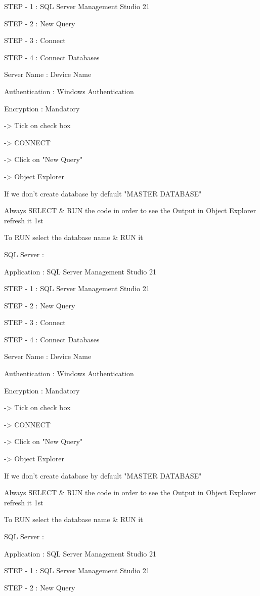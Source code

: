 STEP - 1 : SQL Server Management Studio 21

STEP - 2 : New Query

STEP - 3 : Connect

STEP - 4 : Connect Databases


Server Name : Device Name

Authentication : Windows Authentication

Encryption : Mandatory

-> Tick on check box

-> CONNECT

-> Click on "New Query"

-> Object Explorer


If we don't create database by default "MASTER DATABASE"


Always SELECT & RUN the code in order to see the Output in Object Explorer refresh it 1st


To RUN select the database name & RUN it

SQL Server :

Application : SQL Server Management Studio 21

STEP - 1 : SQL Server Management Studio 21

STEP - 2 : New Query

STEP - 3 : Connect

STEP - 4 : Connect Databases


Server Name : Device Name

Authentication : Windows Authentication

Encryption : Mandatory

-> Tick on check box

-> CONNECT

-> Click on "New Query"

-> Object Explorer


If we don't create database by default "MASTER DATABASE"


Always SELECT & RUN the code in order to see the Output in Object Explorer refresh it 1st


To RUN select the database name & RUN it

SQL Server :

Application : SQL Server Management Studio 21

STEP - 1 : SQL Server Management Studio 21

STEP - 2 : New Query

